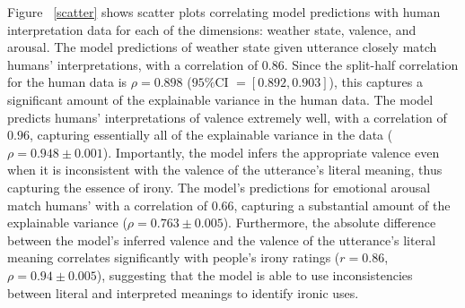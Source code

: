 \documentclass[10pt,letterpaper]{article}
\begin{document}
Figure ~\ref{scatter} shows scatter plots correlating model predictions with human interpretation data for each of the dimensions: weather state, valence, and arousal. %
The model predictions of weather state given utterance closely match humans' interpretations, with a correlation of $0.86$. Since the split-half correlation for the human data is $\rho=0.898$ ($95\%$CI $= [0.892, 0.903]$), this captures a significant amount of the explainable variance in the human data. The model predicts humans' interpretations of valence extremely well, with a correlation of $0.96$, capturing essentially all of the explainable variance in the data ($\rho = 0.948\pm0.001$).
Importantly, the model infers the appropriate valence even when it is inconsistent with the valence of the utterance's literal meaning, thus capturing the essence of irony. 
The model's predictions for emotional arousal match humans' with a correlation of $0.66$, capturing a substantial amount of the explainable variance ($\rho = 0.763\pm0.005$). Furthermore, the absolute difference between the model's inferred valence and the valence of the utterance's literal meaning correlates significantly with people's irony ratings ($r = 0.86$, $\rho=0.94 \pm 0.005$), suggesting that the model is able to use inconsistencies between literal and interpreted meanings to identify ironic uses.
\end{document}
